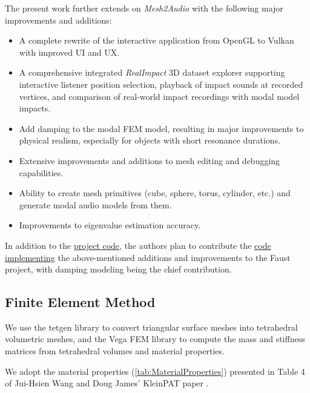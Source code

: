 \documentclass[12pt]{article}
\begin{document}
The present work further extends on \textit{Mesh2Audio} with the following major improvements and additions:
\begin{itemize}
  \item A complete rewrite of the interactive application from OpenGL to Vulkan with improved UI and UX.
  \item A comprehensive integrated \textit{RealImpact} 3D dataset explorer supporting interactive listener position selection, playback of impact sounds at recorded vertices, and comparison of real-world impact recordings with modal model impacts.
  \item Add damping to the modal FEM model, resulting in major improvements to physical realism, especially for objects with short resonance durations.
  \item Extensive improvements and additions to mesh editing and debugging capabilities.
  \item Ability to create mesh primitives (cube, sphere, torus, cylinder, etc.) and generate modal audio models from them.
  \item Improvements to eigenvalue estimation accuracy.
\end{itemize}

In addition to the \href{https://github.com/khiner/MeshEditor}{project code}, the authors plan to contribute the \href{https://github.com/grame-cncm/faust/compare/master-dev...khiner:faust:master-dev}{code implementing} the above-mentioned additions and improvements to the Faust project, with damping modeling being the chief contribution.

\subsection{Finite Element Method}

We use the tetgen library \cite{si_tetgen_2015} to convert triangular surface meshes into tetrahedral volumetric meshes, and the Vega FEM library \cite{vegafem} to compute the mass and stiffness matrices from tetrahedral volumes and material properties.

We adopt the material properties (\ref{tab:MaterialProperties}) presented in Table 4 of Jui-Hsien Wang and Doug James' KleinPAT paper \cite{wang_kleinpat_2019}.
\end{document}
